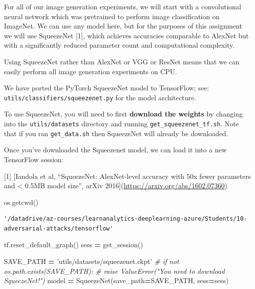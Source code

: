 \documentclass[]{book}
\newenvironment{Shaded}{\begin{snugshade}}{\end{snugshade}}
\newcommand{\StringTok}[1]{\textcolor[rgb]{0.31,0.60,0.02}{#1}}
\newcommand{\CommentTok}[1]{\textcolor[rgb]{0.56,0.35,0.01}{\textit{#1}}}
\newcommand{\OperatorTok}[1]{\textcolor[rgb]{0.81,0.36,0.00}{\textbf{#1}}}
\newcommand{\NormalTok}[1]{#1}
\theoremstyle{definition}
\theoremstyle{definition}
\theoremstyle{definition}
\theoremstyle{remark}
\begin{document}
For all of our image generation experiments, we will start with a
convolutional neural network which was pretrained to perform image
classification on ImageNet. We can use any model here, but for the
purposes of this assignment we will use SqueezeNet {[}1{]}, which
achieves accuracies comparable to AlexNet but with a significantly
reduced parameter count and computational complexity.

Using SqueezeNet rather than AlexNet or VGG or ResNet means that we can
easily perform all image generation experiments on CPU.

We have ported the PyTorch SqueezeNet model to TensorFlow; see:
\texttt{utils/classifiers/squeezenet.py} for the model architecture.

To use SqueezeNet, you will need to first \textbf{download the weights}
by changing into the \texttt{utils/datasets} directory and running
\texttt{get\_squeezenet\_tf.sh}. Note that if you ran
\texttt{get\_data.sh} then SqueezeNet will already be downloaded.

Once you've downloaded the Squeezenet model, we can load it into a new
TensorFlow session:

{[}1{]} {[}Iandola et al, ``SqueezeNet: AlexNet-level accuracy with 50x
fewer parameters and \textless{} 0.5MB model size'', arXiv
2016{]}(\url{https://arxiv.org/abs/1602.07360})

\begin{Shaded}
\begin{Highlighting}[]
\NormalTok{os.getcwd()}
\end{Highlighting}
\end{Shaded}

\begin{verbatim}
'/datadrive/az-courses/learnanalytics-deeplearning-azure/Students/10-adversarial-attacks/tensorflow'
\end{verbatim}

\begin{Shaded}
\end{Shaded}

\begin{Shaded}
\begin{Highlighting}[]
\NormalTok{tf.reset_default_graph()}
\NormalTok{sess }\OperatorTok{=}\NormalTok{ get_session()}

\NormalTok{SAVE_PATH }\OperatorTok{=} \StringTok{'utils/datasets/squeezenet.ckpt'}
\CommentTok{# if not os.path.exists(SAVE_PATH):}
\CommentTok{#     raise ValueError("You need to download SqueezeNet!")}
\NormalTok{model }\OperatorTok{=}\NormalTok{ SqueezeNet(save_path}\OperatorTok{=}\NormalTok{SAVE_PATH, sess}\OperatorTok{=}\NormalTok{sess)}
\end{Highlighting}
\end{Shaded}
\end{document}
